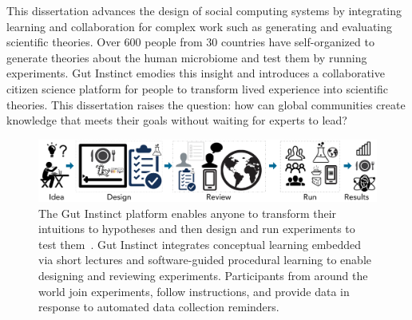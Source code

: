 



This dissertation advances the design of social computing systems by integrating learning and collaboration for complex work such as generating and evaluating scientific theories. Over 600 people from 30 countries have self-organized to generate theories about the human microbiome and test them by running experiments. Gut Instinct emodies this insight and introduces a collaborative citizen science platform for people to transform lived experience into scientific theories. This dissertation raises the question: how can global communities create knowledge that meets their goals without waiting for experts to lead?

\begin{figure}[b] 
  \centering
  \includegraphics[width=1.0\textwidth]{figures/intro/intro-1}
  \caption[The Gut Instinct platform enables anyone to transform their intuitions to hypotheses 
and then design and run experiments to test them]
{The Gut Instinct platform enables anyone to transform their intuitions to hypotheses 
and then design and run experiments to test them~\cite{Pandey, Pandey2017,Pandey2018}. Gut Instinct integrates 
conceptual learning embedded via short lectures and software-guided procedural 
learning to enable designing and reviewing experiments. Participants from around
 the world join experiments, follow instructions, and provide data in response to 
automated data collection reminders. }
  \label{fig:intro-1}
\end{figure}

